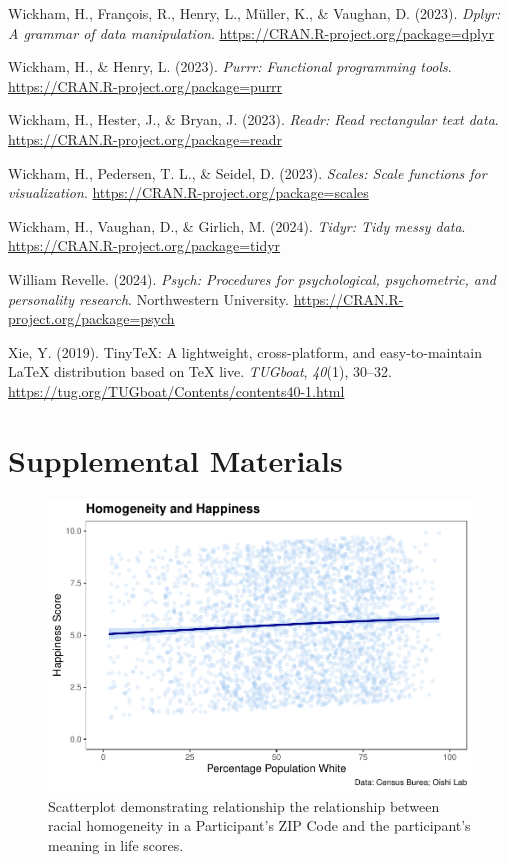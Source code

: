 \documentclass[
  man,floatsintext]{apa7}
\newlength{\cslhangindent}
\newlength{\cslentryspacingunit} %
\newenvironment{CSLReferences}[2] %
 {%
  \setlength{\parindent}{0pt}
  \ifodd #1
  \let\oldpar\par
  \def\par{\hangindent=\cslhangindent\oldpar}
  \fi
  \setlength{\parskip}{#2\cslentryspacingunit}
 }%
 {}
\begin{document}
\begin{CSLReferences}{1}{0}
\leavevmode{}%
Wickham, H., François, R., Henry, L., Müller, K., \& Vaughan, D. (2023). \emph{Dplyr: A grammar of data manipulation}. \url{https://CRAN.R-project.org/package=dplyr}

\leavevmode{}%
Wickham, H., \& Henry, L. (2023). \emph{Purrr: Functional programming tools}. \url{https://CRAN.R-project.org/package=purrr}

\leavevmode{}%
Wickham, H., Hester, J., \& Bryan, J. (2023). \emph{Readr: Read rectangular text data}. \url{https://CRAN.R-project.org/package=readr}

\leavevmode{}%
Wickham, H., Pedersen, T. L., \& Seidel, D. (2023). \emph{Scales: Scale functions for visualization}. \url{https://CRAN.R-project.org/package=scales}

\leavevmode{}%
Wickham, H., Vaughan, D., \& Girlich, M. (2024). \emph{Tidyr: Tidy messy data}. \url{https://CRAN.R-project.org/package=tidyr}

\leavevmode{}%
William Revelle. (2024). \emph{Psych: Procedures for psychological, psychometric, and personality research}. Northwestern University. \url{https://CRAN.R-project.org/package=psych}

\leavevmode{}%
Xie, Y. (2019). TinyTeX: A lightweight, cross-platform, and easy-to-maintain LaTeX distribution based on TeX live. \emph{TUGboat}, \emph{40}(1), 30--32. \url{https://tug.org/TUGboat/Contents/contents40-1.html}

\end{CSLReferences}

\newpage

\hypertarget{Supplemental-Materials}{%
\section{Supplemental Materials}\label{Supplemental-Materials}}

\begin{figure}[H]
\includegraphics[width=0.7\linewidth]{Richness-Diversity-Markdown_files/figure-latex/b-path-scatterplot-1} \caption{Scatterplot demonstrating relationship the relationship between racial homogeneity in a Participant's ZIP Code and the participant's meaning in life scores.}\label{fig:happy-appendix}
\end{figure}
\end{document}
